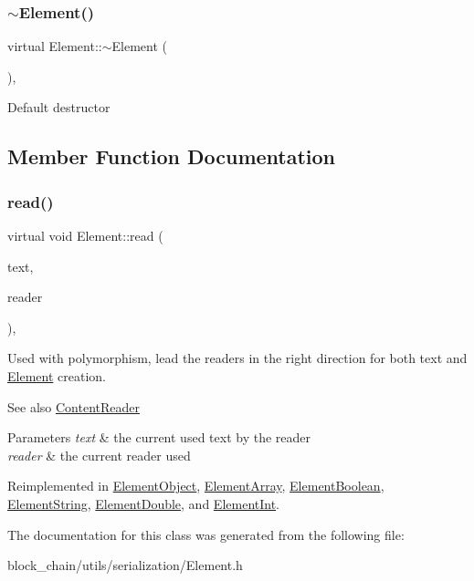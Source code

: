 \subsubsection{\texorpdfstring{$\sim$\+Element()}{~Element()}}
{\footnotesize\ttfamily virtual Element\+::$\sim$\+Element (\begin{DoxyParamCaption}{ }\end{DoxyParamCaption})\hspace{0.3cm}{\ttfamily [virtual]}, {\ttfamily [default]}}

Default destructor 

\subsection{Member Function Documentation}
\mbox{\label{classElement_ab468bd37a9558f5227837a9236bc9e4b}} 
\subsubsection{\texorpdfstring{read()}{read()}}
{\footnotesize\ttfamily virtual void Element\+::read (\begin{DoxyParamCaption}\item[{std\+::string \&}]{text,  }\item[{const \mbox{\hyperlink{classContentReader}{Content\+Reader}} $\ast$}]{reader }\end{DoxyParamCaption})\hspace{0.3cm}{\ttfamily [inline]}, {\ttfamily [virtual]}}

Used with polymorphism, lead the readers in the right direction for both text and \mbox{\hyperlink{classElement}{Element}} creation. \begin{DoxySeeAlso}{See also}
\mbox{\hyperlink{classContentReader}{Content\+Reader}}
\end{DoxySeeAlso}

\begin{DoxyParams}{Parameters}
{\em text} & the current used text by the reader \\
\hline
{\em reader} & the current reader used \\
\hline
\end{DoxyParams}


Reimplemented in \mbox{\hyperlink{classElementObject_a2217d9754771964af5e590a5fabe2c4e}{Element\+Object}}, \mbox{\hyperlink{classElementArray_a5353c82d5c132acdad69858884e3e334}{Element\+Array}}, \mbox{\hyperlink{classElementBoolean_afca7544719a8e13fb38f62d57df343b7}{Element\+Boolean}}, \mbox{\hyperlink{classElementString_a781fe545117610d945772b240f24ac44}{Element\+String}}, \mbox{\hyperlink{classElementDouble_a11bf3651edd2cbcdf04610b113accf90}{Element\+Double}}, and \mbox{\hyperlink{classElementInt_ab5a7d87743dbdc52910c59bc4b93e6da}{Element\+Int}}.



The documentation for this class was generated from the following file\+:\begin{DoxyCompactItemize}
\item 
block\+\_\+chain/utils/serialization/Element.\+h\end{DoxyCompactItemize}
